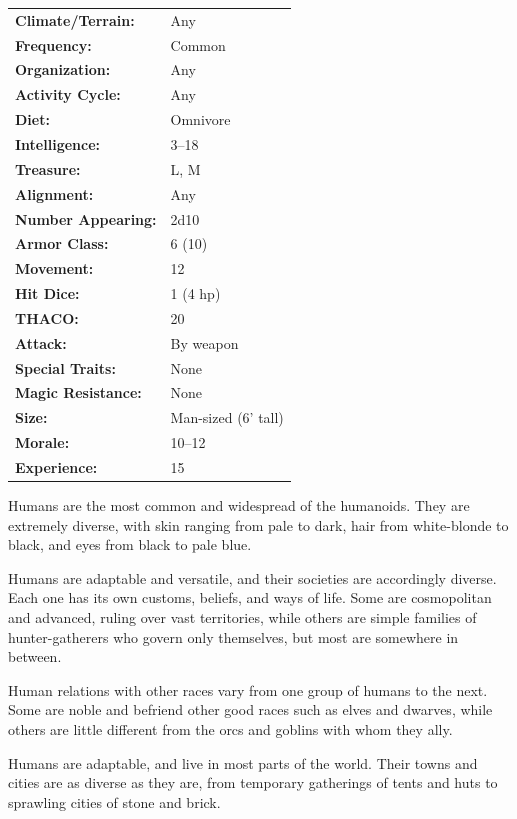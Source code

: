 \begin{multicols}{2}
\begin{minipage}{\columnwidth}
\noindent \begin{tabular}{p{}p{}}
\textbf{Climate/Terrain:}	& Any	\\
\textbf{Frequency:} 		& Common	\\
\textbf{Organization:} 		& Any	\\
\textbf{Activity Cycle:} 	& Any	\\
\textbf{Diet:} 				& Omnivore	\\
\textbf{Intelligence:} 		& 3--18	\\
\textbf{Treasure:} 			& L, M	\\
\textbf{Alignment:} 		& Any	\\
\hline
\textbf{Number Appearing:} 	& 2d10	\\
\textbf{Armor Class:} 		& 6 (10)	\\
\textbf{Movement:} 			& 12	\\
\textbf{Hit Dice:} 			& 1	(4 hp)	\\
\textbf{THACO:} 			& 20	\\
\textbf{Attack:} 			& By weapon	\\
\textbf{Special Traits:} & None	\\
\textbf{Magic Resistance:} 	& None	\\
\textbf{Size:} 				& Man-sized	(6' tall)	\\
\textbf{Morale:} 			& 10--12	\\
\textbf{Experience:} 		& 15	\\
\end{tabular}

\end{minipage}

Humans are the most common and widespread of the humanoids. They are extremely diverse, with skin ranging from pale to dark, hair from white-blonde to black, and eyes from black to pale blue.

Humans are adaptable and versatile, and their societies are accordingly diverse. Each one has its own customs, beliefs, and ways of life. Some are cosmopolitan and advanced, ruling over vast territories, while others are simple families of hunter-gatherers who govern only themselves, but most are somewhere in between.

Human relations with other races vary from one group of humans to the next. Some are noble and befriend other good races such as elves and dwarves, while others are little different from the orcs and goblins with whom they ally. 

Humans are adaptable, and live in most parts of the world. Their towns and cities are as diverse as they are, from temporary gatherings of tents and huts to sprawling cities of stone and brick.


\end{multicols}
